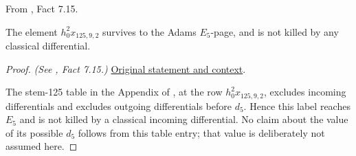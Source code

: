 \begin{fact}
\label{paper:7.15}
From \cite{LWX126}, Fact 7.15.\par
\label{fact:h_0_sq_mul_x_125_9_2}\label{fact:h02x1259}
    The element $h_0^2x_{125,9,2}$ survives to the Adams $E_5$-page, and is not killed by any classical differential.



\end{fact}
\begin{proof}
\textit{(See \cite{LWX126}, Fact 7.15.)} \href{paper/main.tex.html#L2466}{Original statement and context}.

The stem-125 table in the Appendix of \cite{LWX126}, at the row $h_0^2x_{125,9,2}$, excludes incoming differentials and excludes outgoing differentials before $d_5$. Hence this label reaches $E_5$ and is not killed by a classical incoming differential. No claim about the value of its possible $d_5$ follows from this table entry; that value is deliberately not assumed here.
\end{proof}

